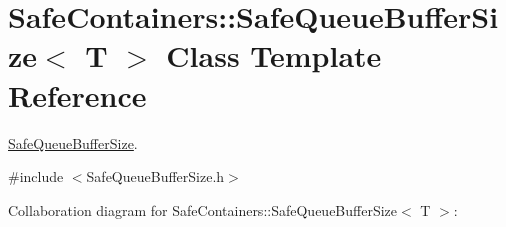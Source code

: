 \hypertarget{classSafeContainers_1_1SafeQueueBufferSize}{}\section{Safe\+Containers\+::Safe\+Queue\+Buffer\+Size$<$ T $>$ Class Template Reference}
\label{classSafeContainers_1_1SafeQueueBufferSize}


\mbox{\hyperlink{classSafeContainers_1_1SafeQueueBufferSize}{Safe\+Queue\+Buffer\+Size}}.  




{\ttfamily \#include $<$Safe\+Queue\+Buffer\+Size.\+h$>$}



Collaboration diagram for Safe\+Containers\+::Safe\+Queue\+Buffer\+Size$<$ T $>$\+:
